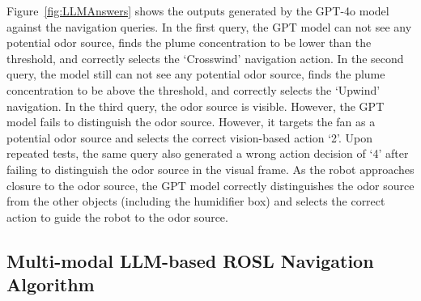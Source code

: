 Figure~\ref{fig:LLMAnswers} shows the outputs generated by the GPT-4o model against the navigation queries. In the first query, the GPT model can not see any potential odor source, finds the plume concentration to be lower than the threshold, and correctly selects the `Crosswind' navigation action. In the second query, the model still can not see any potential odor source, finds the plume concentration to be above the threshold, and correctly selects the `Upwind' navigation. In the third query, the odor source is visible. However, the GPT model fails to distinguish the odor source. However, it targets the fan as a potential odor source and selects the correct vision-based action `2'. Upon repeated tests, the same query also generated a wrong action decision of `4' after failing to distinguish the odor source in the visual frame. As the robot approaches closure to the odor source, the GPT model correctly distinguishes the odor source from the other objects (including the humidifier box) and selects the correct action to guide the robot to the odor source.

\subsection{Multi-modal LLM-based ROSL Navigation Algorithm}\label{Subsec:LLMROSLNav}

